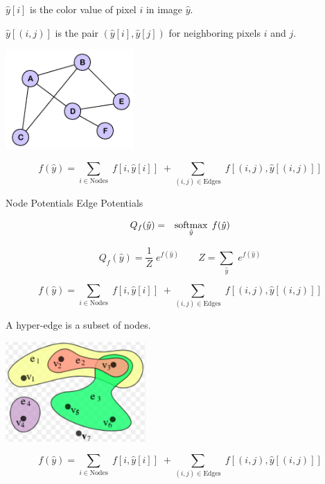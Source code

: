 {\vfill
$\hat{y}[i]$ is the color value of pixel $i$ in image $\hat{y}$.

\vfill
$\hat{y}[(i,j)]$ is the pair $(\hat{y}[i],\hat{y}[j])$ for neighboring pixels $i$ and $j$.


\centerline{\includegraphics[height= 1.5in]{../images/Graph}}

$$f(\hat{y}) = \sum_{i \in \mathrm{Nodes}}\; f[i,\hat{y}[i]]\; + \sum_{(i,j) \in \mathrm{Edges}}\;f[(i,j),\hat{y}[(i,j)]]$$

\vfill
\centerline{Node Potentials \hspace{4em}Edge Potentials}



\begin{eqnarray*}
Q_{f}(\hat{y}) & = & \operatorname*{softmax}_{\hat{y}}\;f(\hat{y})
\end{eqnarray*}

\vfill
$$Q_f(\hat{y}) = \frac{1}{Z} \; e^{f(\hat{y})} \;\;\;\;\;\;\;  Z = \sum_{\hat{y}}\;e^{f(\hat{y})}$$

\vfill
$$f(\hat{y}) = \sum_{i \in \mathrm{Nodes}}\; f[i,\hat{y}[i]]\; + \sum_{(i,j) \in \mathrm{Edges}}\;f[(i,j),\hat{y}[(i,j)]]$$


A hyper-edge is a subset of nodes.

\vfill
\centerline{\includegraphics[height = 1.5in]{../images/HyperGraph}}

$$f(\hat{y}) = \sum_{i \in \mathrm{Nodes}}\; f[i,\hat{y}[i]]\; + \sum_{(i,j) \in \mathrm{Edges}}\;f[(i,j),\hat{y}[(i,j)]]$$

}
